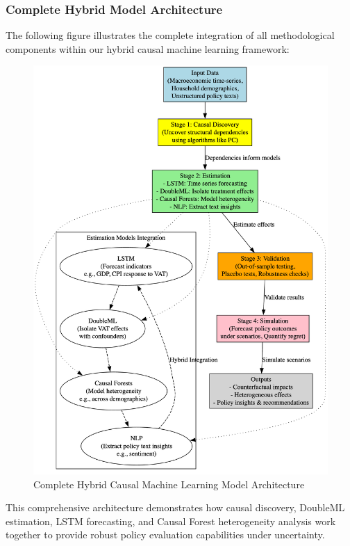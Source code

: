 \subsubsection{Complete Hybrid Model Architecture}
The following figure illustrates the complete integration of all methodological components within our hybrid causal machine learning framework:

\begin{figure}[htbp]
    \centering
    \includegraphics[width=\textwidth]{exports/methodology.png}
    \caption{Complete Hybrid Causal Machine Learning Model Architecture}
    \label{fig:complete_methodology}
\end{figure}

This comprehensive architecture demonstrates how causal discovery, DoubleML estimation, LSTM forecasting, and Causal Forest heterogeneity analysis work together to provide robust policy evaluation capabilities under uncertainty.
